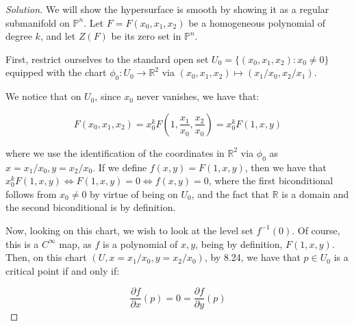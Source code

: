 \documentclass[10pt]{article}
\begin{document}
\begin{proof}[Solution]

We will show the hypersurface is smooth by showing it as a regular submanifold on $\mathbb{P}^n$. Let $F = F(x_0,x_1,x_2)$ be a homogeneous polynomial of degree $k$, and let $Z(F)$ be its zero set in $\mathbb{P}^n$.

First, restrict ourselves to the standard open set $U_0 =  \{ (x_0, x_1, x_2 ) : x_0 \not = 0 \}$ equipped with the chart $\phi_0: U_0 \to \mathbb{R}^2$ via $(x_0, x_1, x_2) \mapsto (x_1/x_0, x_2/x_1)$.

We notice that on $U_0$, since $x_0$ never vanishes, we have that:

$$ F(x_0, x_1, x_2) = x_0^kF\left(1, \frac{x_1}{x_0}, \frac{x_2}{x_0}\right) = x_0^k F(1,x,y) $$

where we use the identification of the coordinates in $\mathbb{R}^2$ via $\phi_0$ as $x = x_1/x_0, y = x_2/x_0$. If we define $f(x,y) = F(1,x,y)$, then we have that $ x_0^k F(1,x,y) \iff F(1,x,y) = 0 \iff f(x,y) = 0$, where the first biconditional follows from $x_0 \not = 0$ by virtue of being on $U_0$, and the fact that $\mathbb{R}$ is a domain and the second biconditional is by definition.

Now, looking on this chart, we wish to look at the level set $f^{-1}(0)$. Of course, this is a $C^\infty$ map, as $f$ is a polynomial of $x,y$, being by definition, $F(1,x,y)$. Then, on this chart $(U, x = x_1/x_0, y = x_2/x_0)$, by 8.24, we have that $p \in U_0$ is a critical point if and only if:

$$ \frac{\partial f}{\partial x} (p) = 0 = \frac{\partial f}{\partial y}(p) $$





\end{proof}
\end{document}
